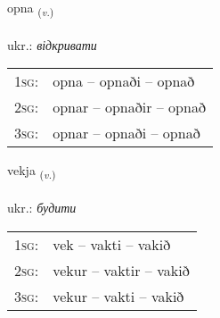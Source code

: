 \documentclass[frontgrid, backgrid]{flacards}\usepackage[]{graphicx}\usepackage[]{xcolor}
\begin{document}
{opna \small{\textsubscript{(\textit{v.})}} \\[1ex] %
\textphonetic{[ɔhpna]} \\
ukr.: \emph{відкривати} \\  [2ex]
\renewcommand*{\arraystretch}{0.8}
\begin{tabular}{p{1cm}l}
\textsc{1sg}: & opna -- opnaði -- opnað \\ 
\textsc{2sg}: & opnar -- opnaðir -- opnað \\ 
\textsc{3sg}: & opnar -- opnaði -- opnað \\ 
\end{tabular}
}

\renewcommand{\flhead}{\vskip5pt \fboxsep=0pt {\small\bfseries\footnotesize Sagnorð | дієслово}}
\renewcommand{\fcfoot}{\vskip5pt \fboxsep=0pt \hspace{2pt}{\small\bfseries\footnotesize 1K}}

\renewcommand{\blhead}{\vskip5pt {\small\bfseries\footnotesize Sagnorð | дієслово }}
\renewcommand{\bcfoot}{\vskip5pt \hspace{2pt}{\small\bfseries\footnotesize 1K}}


{vekja \small{\textsubscript{(\textit{v.})}} \\[1ex] %
\textphonetic{[vɛːca]} \\
ukr.: \emph{будити} \\  [2ex]
\renewcommand*{\arraystretch}{0.8}
\begin{tabular}{p{1cm}l}
\textsc{1sg}: & vek -- vakti -- vakið \\ 
\textsc{2sg}: & vekur -- vaktir -- vakið \\ 
\textsc{3sg}: & vekur -- vakti -- vakið \\ 
\end{tabular}
}

\renewcommand{\flhead}{\vskip5pt \fboxsep=0pt {\small\bfseries\footnotesize Nafnorð | іменник}}
\renewcommand{\fcfoot}{\vskip5pt \fboxsep=0pt \hspace{2pt}{\small\bfseries\footnotesize 1K}}
\end{document}
